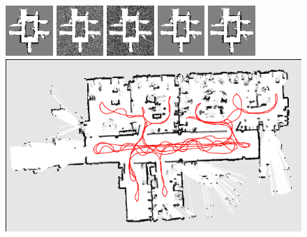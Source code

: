 \documentclass[letterpaper, 10 pt, conference]{ieeeconf} %
\begin{document}
\begin{figure}
  \includegraphics[width=0.16\textwidth]{../../Data/hospital_player/TwoAssumptionAlgo.png}%
  \includegraphics[width=0.16\textwidth]{../../Data/hospital_player/SICKSlowMetropolis.png}%
  \includegraphics[width=0.16\textwidth]{../../Data/hospital_player/SICKDDMCMC.png}%
  \includegraphics[width=0.16\textwidth]{../../Data/hospital_player/run_belief_propagation.png}%
  \includegraphics[width=0.16\textwidth]{../../Data/hospital_player/dualdecomposition.png}\\
  \includegraphics[height=0.16\textwidth,                                   angle=90]{../../Data/albertb.sm/path.png}%

\end{figure}
\end{document}
